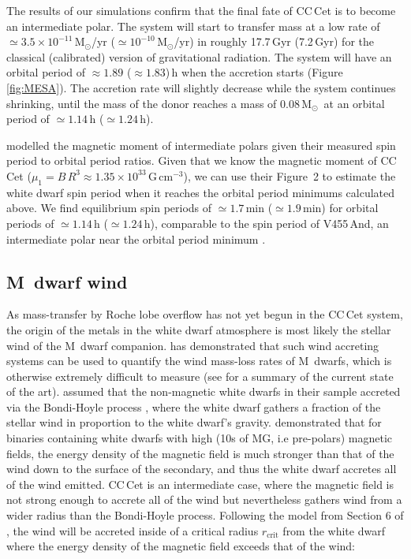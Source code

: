 \documentclass[fleqn,usenatbib]{mnras}
\newcommand{\Msun}{\mbox{$\mathrm{M}_{\odot}$}}
\begin{document}
The results of our simulations confirm that the final fate of CC\,Cet is to become an intermediate polar. The system will start to transfer mass at a low rate of $\simeq 3.5\times10^{-11}$\,\Msun/yr ($\simeq 10^{-10}$\,\Msun/yr) in roughly 17.7\,Gyr (7.2\,Gyr) for the classical (calibrated) version of gravitational radiation. The system will have an orbital period of $\approx 1.89$ ($\approx 1.83$)\,h when the accretion starts (Figure \ref{fig:MESA}). The accretion rate will slightly decrease while the system continues shrinking, until the mass of the donor reaches a mass of 0.08\,\Msun\ at an orbital period of $\simeq1.14$\,h ($\simeq1.24$\,h). 

\citet{nortonetal04-1} modelled the magnetic moment of intermediate polars given their measured  spin period to orbital period ratios. Given that we know the magnetic moment of CC\,Cet ($\mu_1 = B\,R^3 \approx1.35\times10^{33}$\,G\,cm$^{-3}$), we can use their Figure~2 to estimate the white dwarf spin period when it reaches the orbital period minimums calculated above. We find equilibrium spin periods of $\simeq1.7$\,min ($\simeq1.9$\,min) for orbital periods of $\simeq1.14$\,h ($\simeq1.24$\,h),  comparable to the spin period of V455\,And, an intermediate polar near the orbital period minimum \citep{araujo-betancoretal05-1, bloemenetal13-1}.



\subsection{M~dwarf wind}
\label{s:wind}

As mass-transfer by Roche lobe overflow has not yet begun in the CC\,Cet system, the origin of the metals in the white dwarf atmosphere is most likely the stellar wind of the M~dwarf companion. \citet{debes06-1} has demonstrated that such wind accreting systems can be used to quantify the wind mass-loss rates of M~dwarfs, which is otherwise extremely difficult to measure (see \citealt{woodetal21-1} for a summary of the current state of the art). \citet{debes06-1} assumed that the non-magnetic white dwarfs in their sample accreted via the Bondi-Hoyle process \citep{bondi+hoyle44-1}, where the white dwarf gathers a fraction of the stellar wind in proportion to the white dwarf's gravity. \citet{webbink+wickramasinghe05-1} demonstrated that for binaries containing white dwarfs with high (10s of MG, i.e pre-polars) magnetic fields, the energy density of the magnetic field is much stronger than that of the wind down to the surface of the secondary, and thus the white dwarf accretes all of the wind emitted. CC\,Cet is an intermediate case, where the magnetic field is not strong enough to accrete all of the wind but nevertheless gathers wind from a wider radius than the Bondi-Hoyle process. Following the model from Section 6 of \citet{webbink+wickramasinghe05-1}, the wind will be accreted inside of a critical radius $r_{\mathrm{crit}}$ from the white dwarf where the energy density of the magnetic field  exceeds that of the wind:
\end{document}
